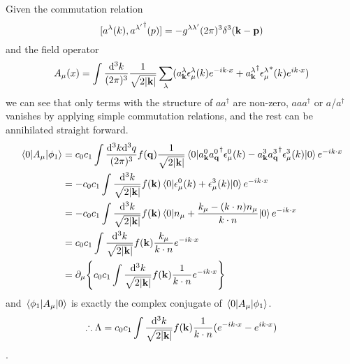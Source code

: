 \documentclass{article}
\newcommand{\vbk}{\vb{k}}
\newcommand{\la}{\lambda}
\begin{document}
Given the commutation relation
$$[a^{\la}(k),{a^{\la'}}^{\dagger}(p)]=-g^{\la\la'}(2\pi)^3\delta^3(\vb{k-p})$$
and the field operator
$$A_{\mu}(x)=\int\frac{\dd^3k}{(2\pi)^3}\frac{1}{\sqrt{2\abs{\vb{k}}}}\sum_{\la}(a^{\la}_{\vbk}\epsilon^{\la}_{\mu}(k)e^{-ik\cdot x}+{a^{\la}_{\vbk}}^{\dagger}{\epsilon^{\la}_{\mu}}^*(k)e^{ik\cdot x})$$
we can see that only terms with the structure of $aa^{\dagger}$ are non-zero, $aaa^{\dagger}$ or $a$/$a^{\dagger}$ vanishes by applying simple commutation relations, and the rest can be annihilated straight forward.
\begin{align*}
  \mel{0}{A_{\mu}}{\phi_1}&=c_0c_1\int\frac{\dd^3k\dd^3q}{(2\pi)^3}f(\vb{q})\frac{1}{\sqrt{2\abs{\vb{k}}}}\mel{0}{a^0_{\vb{k}}{a^0_{\vb{q}}}^{\dagger}\epsilon^0_{\mu}(k)-a^3_{\vbk}{a^3_{\vb{q}}}^{\dagger}\epsilon^3_{\mu}(k)}{0}e^{-ik\cdot x}\\
  &=-c_0c_1\int\frac{\dd^3k}{\sqrt{2\abs{\vb{k}}}}f(\vbk)\mel{0}{\epsilon^0_{\mu}(k)+\epsilon^3_{\mu}(k)}{0}e^{-ik\cdot x}\\
  &=-c_0c_1\int\frac{\dd^3k}{\sqrt{2\abs{\vb{k}}}}f(\vbk)\mel{0}{n_{\mu}+\frac{k_{\mu}-(k\cdot n)n_{\mu}}{k\cdot n}}{0}e^{-ik\cdot x}\\
  &=c_0c_1\int\frac{\dd^3k}{\sqrt{2\abs{\vb{k}}}}f(\vbk)\frac{k_{\mu}}{k\cdot n}e^{-ik\cdot x}\\
  &=\partial_{\mu}\Bqty{c_0c_1\int\frac{\dd^3k}{\sqrt{2\abs{\vb{k}}}}f(\vbk)\frac{1}{k\cdot n}e^{-ik\cdot x}}
\end{align*}
and $\mel{\phi_1}{A_{\mu}}{0}$ is exactly the complex conjugate of $\mel{0}{A_{\mu}}{\phi_1}$.
$$\therefore\Lambda=c_0c_1\int\frac{\dd^3k}{\sqrt{2\abs{\vb{k}}}}f(\vbk)\frac{1}{k\cdot n}(e^{-ik\cdot x}-e^{ik\cdot x})$$.
\end{document}

